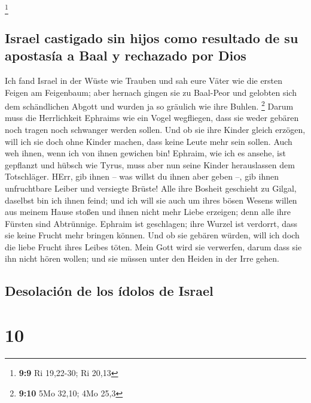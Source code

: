 \footnote{\textbf{9:9} Ri 19,22-30; Ri 20,13}

\hypertarget{israel-castigado-sin-hijos-como-resultado-de-su-apostasuxeda-a-baal-y-rechazado-por-dios}{%
\subsection{Israel castigado sin hijos como resultado de su apostasía a
Baal y rechazado por
Dios}\label{israel-castigado-sin-hijos-como-resultado-de-su-apostasuxeda-a-baal-y-rechazado-por-dios}}

 Ich fand Israel in der Wüste wie Trauben und sah eure
Väter wie die ersten Feigen am Feigenbaum; aber hernach gingen sie zu
Baal-Peor und gelobten sich dem schändlichen Abgott und wurden ja so
gräulich wie ihre Buhlen. \footnote{\textbf{9:10} 5Mo 32,10; 4Mo 25,3}
 Darum muss die Herrlichkeit Ephraims wie ein Vogel
wegfliegen, dass sie weder gebären noch tragen noch schwanger werden
sollen.  Und ob sie ihre Kinder gleich erzögen, will ich
sie doch ohne Kinder machen, dass keine Leute mehr sein sollen. Auch weh
ihnen, wenn ich von ihnen gewichen bin!  Ephraim, wie ich
es ansehe, ist gepflanzt und hübsch wie Tyrus, muss aber nun seine
Kinder herauslassen dem Totschläger.  HErr, gib ihnen --
was willst du ihnen aber geben --, gib ihnen unfruchtbare Leiber und
versiegte Brüste!  Alle ihre Bosheit geschieht zu Gilgal,
daselbst bin ich ihnen feind; und ich will sie auch um ihres bösen
Wesens willen aus meinem Hause stoßen und ihnen nicht mehr Liebe
erzeigen; denn alle ihre Fürsten sind Abtrünnige. 
Ephraim ist geschlagen; ihre Wurzel ist verdorrt, dass sie keine Frucht
mehr bringen können. Und ob sie gebären würden, will ich doch die liebe
Frucht ihres Leibes töten.  Mein Gott wird sie verwerfen,
darum dass sie ihn nicht hören wollen; und sie müssen unter den Heiden
in der Irre gehen.

\hypertarget{desolaciuxf3n-de-los-uxeddolos-de-israel}{%
\subsection{Desolación de los ídolos de
Israel}\label{desolaciuxf3n-de-los-uxeddolos-de-israel}}

\hypertarget{section-9}{%
\section{10}\label{section-9}}

